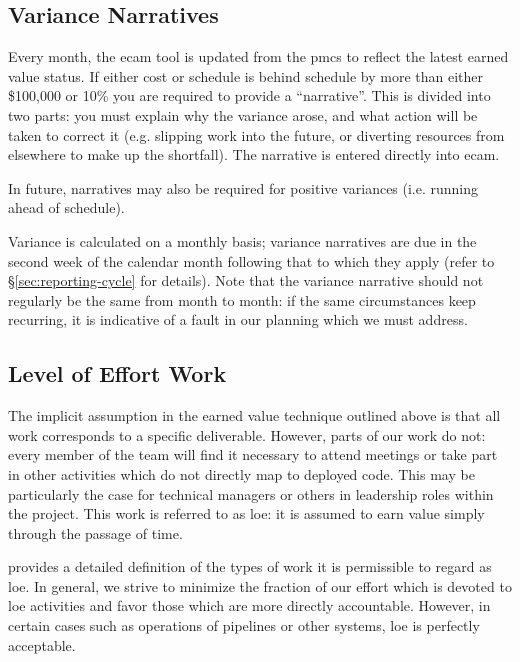 \subsection{Variance Narratives}
\label{sec:variance-narrative}

Every month, the \gls{ecam} tool is updated from the \gls{pmcs} to reflect the latest earned value status.
If either cost or schedule is behind schedule by more than either \$100,000 or 10\% you are required to provide a ``narrative''.
This is divided into two parts: you must explain why the variance arose, and what action will be taken to correct it (e.g.  slipping work into the future, or diverting resources from elsewhere to make up the shortfall).
The narrative is entered directly into \gls{ecam}.

In future, narratives may also be required for positive variances (i.e. running ahead of schedule).

Variance is calculated on a monthly basis; variance narratives are due in the second week of the calendar month following that to which they apply (refer to \S\ref{sec:reporting-cycle} for details).
Note that the variance narrative should not regularly be the same from month to month: if the same circumstances keep recurring, it is indicative of a fault in our planning which we must address.

\subsection{Level of Effort Work}
\label{sec:loe}

The implicit assumption in the earned value technique outlined above is that all work corresponds to a specific deliverable.
However, parts of our work do not: every member of the team will find it necessary to attend meetings or take part in other activities which do not directly map to deployed code.
This may be particularly the case for technical managers or others in leadership roles within the project.
This work is referred to as \gls{loe}: it is assumed to earn value simply through the passage of time.

 provides a detailed definition of the types of work it is permissible to regard as \gls{loe}.
In general, we strive to minimize the fraction of our effort which is devoted to \gls{loe} activities and favor those which are more directly accountable.
However, in certain cases such as operations of pipelines or other systems, \gls{loe} is perfectly acceptable.

